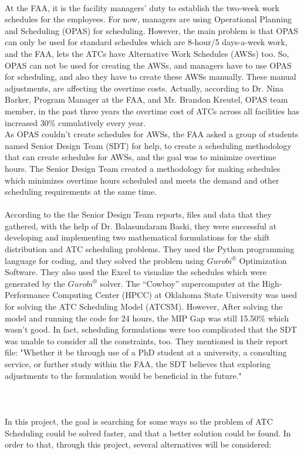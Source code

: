 \documentclass[11pt]{article}
\begin{document}
\\

At the FAA, it is the facility managers' duty to establish the two-week work schedules for the employees. For now, managers are using Operational Planning and Scheduling (OPAS) for scheduling. However, the main problem is that OPAS can only be used for standard schedules which are 8-hour/5 days-a-week work, and the FAA, lets the ATCs have Alternative Work Schedules (AWSs) too. So, OPAS can not be used for creating the AWSs, and managers have to use OPAS for scheduling, and also they have to  create these AWSs manually. These manual adjustments, are affecting the overtime costs. Actually, according to Dr. Nina Barker, Program Manager at the FAA, and Mr. Brandon Kreutel, OPAS team member, in the past three years the overtime cost of ATCs across all facilities  has increased 30\% cumulatively every year. 
 \\

As OPAS couldn't create schedules for AWSs, the FAA asked a group of students named Senior Design Team (SDT) for help, to create a scheduling methodology that can create schedules for AWSs, and the goal was to minimize overtime hours. The Senior Design Team created a methodology for making schedules which minimizes overtime hours scheduled and meets the demand and other scheduling requirements at the same time.  \\

\\

According to the the Senior Design Team reports, files and data that they gathered, with the help of Dr. Balasundaram Baski, they were successful at developing and implementing two mathematical formulations for the shift distribution and ATC scheduling problems. They used the Python programming language for coding, and they solved the problem using $ Gurobi^{®}$ Optimization Software. They also used the Excel to visualize the schedules which were generated by the $Gurobi^{®}$ solver. The “Cowboy” supercomputer at the High-Performance Computing Center (HPCC) at Oklahoma State University was used for solving the ATC Scheduling Model (ATCSM). However, After solving the model and running the code for 24 hours, the MIP Gap was still  15.50\% which wasn't good. In fact, scheduling formulations were too complicated that the SDT was unable to consider all the constraints, too. They mentioned in their report file: "Whether it be through use of a PhD student at a university, a consulting service, or further study within the FAA, the SDT believes that exploring adjustments to the formulation would be beneficial in the future."  
 \\
 \\
 \\
\\
 In this project, the goal is searching for some ways so the problem of ATC Scheduling could be solved faster, and that a better solution could be found. In order to that, through this project, several alternatives will be considered: \\
 
\end{document}
